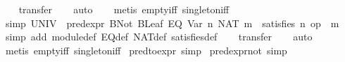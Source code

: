 \begin{isabellebody}
\ \ \isamarkupfalse%
\ transfer\isanewline
\ \ \isamarkupfalse%
\ auto\isanewline
\ \ \isamarkupfalse%
\ {}metis\ empty{}iff\ singleton{}iff{}%
\endisatagproof
{\isafoldproof}%
%
\isadelimproof
\isanewline
%
\endisadelimproof
\isanewline
{}\isamarkupfalse%
\ {}simp{}{}\ {}UNIV\ {}\ pred{}expr\ {}BNot\ {}BLeaf\ {}EQ\ {}Var\ n{}\ {}NAT\ m{}{}{}{}\ {}\ satisfies\ n\ {}op\ {}\ m{}{}\isanewline
%
\isadelimproof
\ \ %
\endisadelimproof
%
\isatagproof
{}\isamarkupfalse%
\ {}simp\ add{}\ module{}def\ EQ{}def\ NAT{}def\ satisfies{}def{}\isanewline
\ \ \isamarkupfalse%
\ transfer\isanewline
\ \ \isamarkupfalse%
\ auto\isanewline
\ \ \isamarkupfalse%
\ {}metis\ empty{}iff\ singleton{}iff{}%
\endisatagproof
{\isafoldproof}%
%
\isadelimproof
\isanewline
%
\endisadelimproof
\isanewline
{}\isamarkupfalse%
\ pred{}to{}expr\ {}simp{}\isanewline
{}\isamarkupfalse%
\ pred{}expr{}not\ {}simp{}\isanewline

\end{isabellebody}
